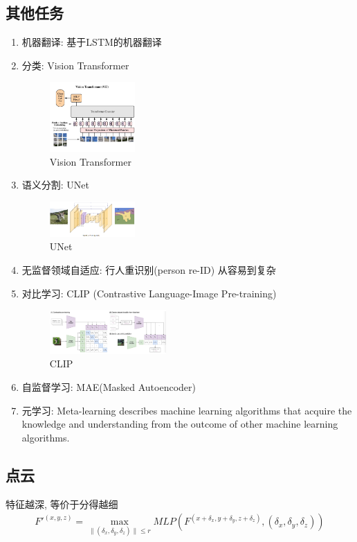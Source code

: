 \subsection{其他任务}
\begin{enumerate}
    \item 机器翻译: 基于LSTM的机器翻译
    \item 分类: Vision Transformer
    \begin{figure}[!htb]
        \centering
        \includegraphics[width=0.309\textwidth]{pic/DL3/Vision Transformer}
        \caption{Vision Transformer}
    \end{figure}
    
    \item 语义分割: UNet
    \begin{figure}[!htb]
        \centering
        \includegraphics[width=0.309\textwidth]{pic/DL3/UNet.png}
        \caption{UNet}
    \end{figure}
    
    \item 无监督领域自适应: 行人重识别(person re-ID) 从容易到复杂
    \item 对比学习: CLIP (Contrastive Language-Image Pre-training)
    \begin{figure}[!htb]
        \centering
        \includegraphics[width=0.42\textwidth]{pic/DL3/CLIP.png}
        \caption{CLIP}
    \end{figure}
    
    \item 自监督学习: MAE(Masked Autoencoder)
    \item 元学习: Meta-learning describes machine learning algorithms that acquire the knowledge and understanding from the outcome of other machine learning algorithms.
\end{enumerate}


\subsection{点云}
特征越深, 等价于分得越细
\begin{align*}
    F'^{(x,y,z)}=\max_{\| (\delta_x, \delta_y, \delta_z) \|\le r}MLP(F^{(x+\delta_x, y+\delta_y,z+\delta_z)}, (\delta_x, \delta_y, \delta_z))
\end{align*}